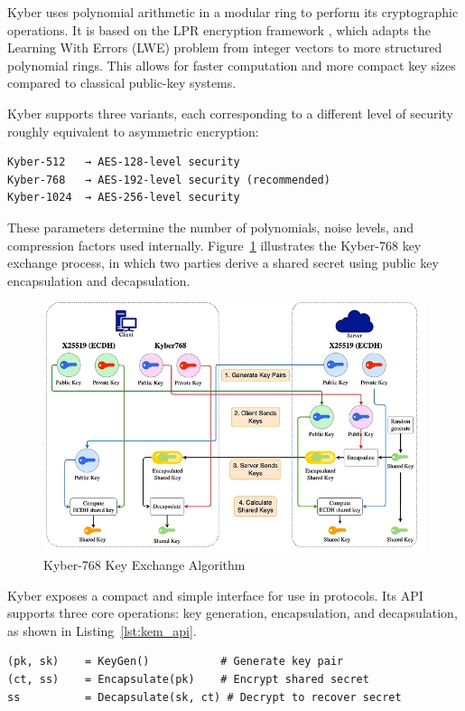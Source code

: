 Kyber uses polynomial arithmetic in a modular ring to perform its cryptographic operations. It is based on the LPR encryption framework \cite{kyber2021}, which adapts the Learning With Errors (LWE) problem from integer vectors to more structured polynomial rings. This allows for faster computation and more compact key sizes compared to classical public-key systems.

Kyber supports three variants, each corresponding to a different level of security roughly equivalent to asymmetric encryption:

\begin{verbatim}
Kyber-512   → AES-128-level security
Kyber-768   → AES-192-level security (recommended)
Kyber-1024  → AES-256-level security
\end{verbatim}

These parameters determine the number of polynomials, noise levels, and compression factors used internally. Figure~\ref{fig:kyber_768} illustrates the Kyber-768 key exchange process, in which two parties derive a shared secret using public key encapsulation and decapsulation.

\begin{figure}[htbp]
\centering
\includegraphics[width=0.9\linewidth]{figures/kyber_768.png}
\caption{Kyber-768 Key Exchange Algorithm \cite{Pathum_2025}}
\label{fig:kyber_768}
\end{figure}

Kyber exposes a compact and simple interface for use in protocols. Its API supports three core operations: key generation, encapsulation, and decapsulation, as shown in Listing~\ref{lst:kem_api}.

\begin{lstlisting}[style=kemstyle, caption={Kyber KEM API}, label={lst:kem_api}]
(pk, sk)    = KeyGen()           # Generate key pair
(ct, ss)    = Encapsulate(pk)    # Encrypt shared secret
ss          = Decapsulate(sk, ct) # Decrypt to recover secret
\end{lstlisting}

